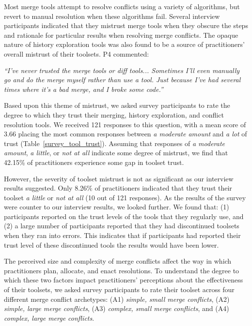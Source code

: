 \label{tool_trust}
Most merge tools attempt to resolve conflicts using a variety of algorithms, but revert to manual resolution when these algorithms fail.
Several interview participants indicated that they mistrust merge tools when they obscure the steps and rationale for particular results when resolving merge conflicts.
The opaque nature of history exploration tools was also found to be a source of practitioners' overall mistrust of their toolsets.
P4 commented:
\begin{quoting}
\textit{``I've never trusted the merge tools or diff tools... Sometimes I'll even manually go and do the merge myself rather than use a tool. Just because I've had several times where it's a bad merge, and I broke some code.''}
\end{quoting}

Based upon this theme of mistrust, we asked survey participants to rate the degree to which they trust their merging, history exploration, and conflict resolution tools.
We received 121 responses to this question, with a mean score of 3.66 placing the most common responses between \textit{a moderate amount} and \textit{a lot} of trust (Table~\ref{survey_tool_trust}).
Assuming that responses of \textit{a moderate amount}, \textit{a little}, or \textit{not at all} indicate some degree of mistrust, we find that 42.15\% of practitioners experience some gap in toolset trust.

However, the severity of toolset mistrust is not as significant as our interview results suggested.
Only 8.26\% of practitioners indicated that they trust their toolset \textit{a little} or \textit{not at all} (10 out of 121 responses).
As the results of the survey were counter to our interview results, we looked further. We found that: (1) participants reported on the trust levels of the tools that they regularly use, and (2) a large number of participants reported that they had discontinued toolsets when they ran into errors. This indicates that if participants had reported their trust level of these discontinued tools the results would have been lower.

\label{tool_effectiveness}
The perceived size and complexity of merge conflicts affect the way in which practitioners plan, allocate, and enact resolutions.
To understand the degree to which these two factors impact practitioners' perceptions about the effectiveness of their toolsets, we asked survey participants to rate their toolset across four different merge conflict archetypes: (A1) \textit{simple, small merge conflicts}, (A2) \textit{simple, large merge conflicts}, (A3) \textit{complex, small merge conflicts}, and (A4) \textit{complex, large merge conflicts}.

